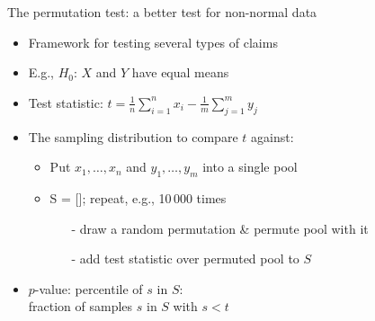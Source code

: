 \begin{frame}[c]{The permutation test: a better test for non-normal data}

\begin{itemize}
  \item Framework for testing several types of claims
  \item E.g., $H_0$: $X$ and $Y$ have \alert{equal means}
  \item Test statistic: \alert{$t = \frac{1}{n}\sum_{i=1}^n x_i  - 
  \frac{1}{m}\sum_{j=1}^m y_j$}
  \pause
  \medskip
  \item The sampling distribution to compare $t$ against:
  \begin{itemize}
    \item Put $x_1, \dots, x_n$ and $y_1, \dots, y_m$ into a single pool
    \item S = []; repeat, e.g., 10\,000 times
    \begin{itemize}
      \item[-] draw a random permutation \& permute pool with it
      \item[-] add test statistic over permuted pool to $S$
    \end{itemize}
  \end{itemize}
  \pause
  \medskip
  \item $p$-value: percentile of $s$ in $S$:\\
  fraction of samples $s$ in $S$ with $s < t$

\end{itemize}

\end{frame}

